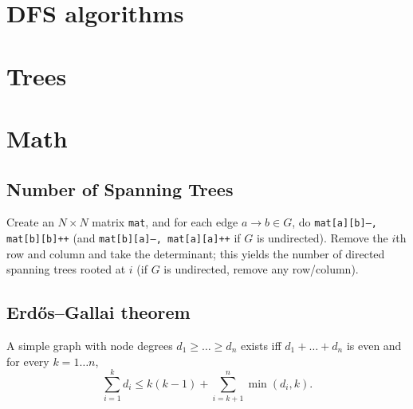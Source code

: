 \section{DFS algorithms}

\section{Trees}

\section{Math}
	\subsection{Number of Spanning Trees}
		Create an $N\times N$ matrix \texttt{mat}, and for each edge $a \rightarrow b \in G$, do
		\texttt{mat[a][b]--, mat[b][b]++} (and \texttt{mat[b][a]--, mat[a][a]++} if $G$ is undirected).
		Remove the $i$th row and column and take the determinant; this yields the number of directed spanning trees rooted at $i$
		(if $G$ is undirected, remove any row/column).

	\subsection{Erd\H{o}s--Gallai theorem}
		A simple graph with node degrees $d_1 \ge \dots \ge d_n$ exists iff $d_1 + \dots + d_n$ is even and for every $k = 1\dots n$,
		\[ \sum _{i=1}^{k}d_{i}\leq k(k-1)+\sum _{i=k+1}^{n}\min(d_{i},k). \]

